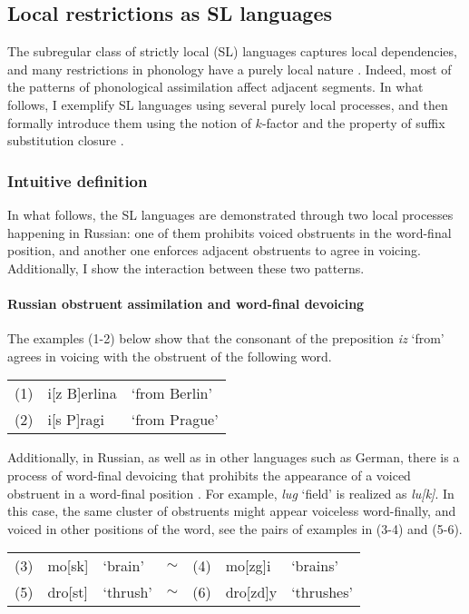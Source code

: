 \subsection{Local restrictions as SL languages}
\label{russianwfdpatternn}

The subregular class of strictly local (SL) languages captures local dependencies, and many restrictions in phonology have a purely local nature \citep{RogersPullum2011}.
Indeed, most of the patterns of phonological assimilation affect adjacent segments.
In what follows, I exemplify SL languages using several purely local processes, and then formally introduce them using the notion of $k$-factor and the property of suffix substitution closure \citep{RogersEtAl13}.

\subsubsection{Intuitive definition}

In what follows, the SL languages are demonstrated through two local processes happening in Russian: one of them prohibits voiced obstruents in the word-final position, and another one enforces adjacent obstruents to agree in voicing.
Additionally, I show the interaction between these two patterns.

\paragraph{Russian obstruent assimilation and word-final devoicing}
The examples (1-2) below show that the consonant of the preposition \emph{iz} `from' agrees in voicing with the obstruent of the following word.

\medskip
\begin{tabular}{lll}
(1) & i[z B]erlina & `from Berlin' \\
(2) & i[s P]ragi & `from Prague'
\end{tabular}
\medskip

Additionally, in Russian, as well as in other languages such as German, there is a process of word-final devoicing that prohibits the appearance of a voiced obstruent in a word-final position \citep{Wiebke1995,Padgett2002ms}.
For example, \emph{lug} `field' is realized as \emph{lu[k]}.
In this case, the same cluster of obstruents might appear voiceless word-finally, and voiced in other positions of the word, see the pairs of examples in (3-4) and (5-6).

\medskip
\begin{tabular}{lllclll}
(3) & mo[sk] & `brain' & $\sim$ & (4) & mo[zg]i & `brains' \\
(5) & dro[st] & `thrush' & $\sim$ & (6) & dro[zd]y & `thrushes'
\end{tabular}
\medskip

